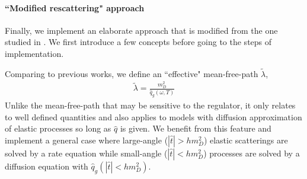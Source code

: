 \documentclass[aps, prc, reprint, amsmath, groupedaddress, nofootinbib]{revtex4-1}
\begin{document}
\paragraph*{``Modified rescattering" approach} Finally, we implement an elaborate approach that is modified from the one studied in \cite{Zapp:2011ya,Park:thesis,Park:2016jap}.
We first introduce a few concepts before going to the steps of implementation.

Comparing to previous works, we define an ``effective" mean-free-path $\tilde{\lambda}$,
\begin{eqnarray}\label{eq:effmpf}
\tilde{\lambda} = \frac{m_D^2}{\hat{q}_g(\omega, T)}
\end{eqnarray}
Unlike the mean-free-path that may be sensitive to the regulator, it only relates to well defined quantities and also applies to models with diffusion approximation of elastic processes so long as $\hat{q}$ is given.
We benefit from this feature and implement a general case where large-angle ($|\hat{t}| > h m_D^2$) elastic scatterings are solved by a rate equation while small-angle ($|\hat{t}| < h m_D^2$) processes are solved by a diffusion equation with $\hat{q}_g(|\hat{t}|<h m_D^2)$.
\end{document}
